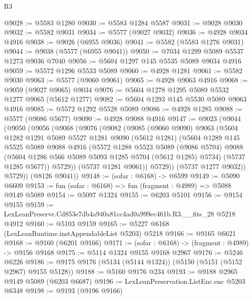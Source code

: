 \begin{lexlean}{R3}
\begin{coremodule}
@9028 := @5583 @1280
@9030 := @5583 @1284 @5587
@9031 := @9028 @9030
@9032 := @5582 @9031
@9034 := @5577 (@9027 @9032)
@9036 := @4928 @9034 @4916
@9038 := @9026 (@6955 @9036)
@9041 := @5582 (@5583 @1276 @9031)
@9044 := @9038 (@5577 (@6955 @9041))
@9050 := @7034 @1299 @5089 @5537 @1273 @9036 @7040
@9056 := @5604 @1297 @145 @5535 @5089 @9034 @4916
@9059 := @5572 @1296 @5533 @5089
@9060 := @4928 @1281
@9061 := @5582 @9030
@9063 := @5577 (@9060 @9061)
@9065 := @4928 @9063 @4916
@9068 := @9059 (@9027 @9065) @9034
@9076 := @5604 @1278 @1295 @5089 @5532 @1277 @9065 (@5612 @1277)
@9082 := @5604 @1293 @145 @5530 @5089 @9063 @4916
@9085 := @5572 @1292 @5528 @5089
@9086 := @4928 @1285
@9088 := @5577 (@9086 @5677)
@9090 := @4928 @9088 @4916
@9147 := @9023
    (@9044
      (@9050
        (@9056
          (@9068
            (@9076
              (@9082
                (@9085
                  (@9060 @9090)
                  @9063
                  (@5604
                    @1282
                    @1291
                    @5089
                    @5527
                    @1281
                    @9090
                    (@5612 @1281)
                    (@5604
                      @1289
                      @145
                      @5525
                      @5089
                      @9088
                      @4916
                      (@5572
                        @1288
                        @5523
                        @5089
                        (@9086 @5704)
                        @9088
                        (@5604 @1286 @566 @5089 @5093 @1285 @5704 (@5612 @1285) @5734)
                        (@5737 @1285 @5677))
                      @5729))
                  (@5737 @1281 @9061))
                @5729))
            (@5737 @1277 @9032))
          @5729))
      (@8126 @9041))
@9148 := (sofar : @6168) -> @6599
@9149 := @5090 @6609
@9153 := fun (sofar : @6168) => fun (fragment : @4989) => @5088 @9149 @5089
@9154 := @5097 @1324
@9155 := @6203 @5101
@9156 := @9154 @9155
@9159 := LexLeanPreserve.Cd853e7db4a940a81cc4ad0a999ec461b.R3.__fits_28 @5218 @4912
@9160 := @5103 @9159
@9165 := @5227 @6168 (LexLeanRuntime.instAppendableList @5203) @5218
@9166 := @9165 @6621
@9168 := @9160 (@6201 @9166)
@9171 := (sofar : @6168) -> (fragment : @4989) -> @9156 @9168
@9175 := @5114 @1324 @9155 @9168 @2967
@9176 := @5246 @6226
@9186 := @9175 @9176 (@5134 (@5144 @1324)) (@5150 (@5151 (@5152 @2967) @9155 @5128))
@9188 := @5160 @9176 @234
@9193 := @9188 @2965 @9149 @5089 (@6203 @6687)
@9196 := LexLeanPreservation.ListEnc.enc @5203 @6348
@9198 := @9193 (@9196 @9166)

\end{coremodule}
\end{lexlean}
